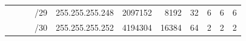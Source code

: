 \documentclass[11pt,a4paper]{article}
\begin{document}
\begin{table}[]
\begin{tabular}{ccccl|r|r|r|r|r|r|}
\multicolumn{1}{|c|}{}                                 & \multicolumn{1}{c|}{}                                  & \multicolumn{1}{c|}{}                                  & \multicolumn{1}{c|}{/29} & 255.255.255.248              & 2097152                      & 8192                         & 32                           & 6                            & 6                            & 6                            \\ \cline{4-11} 
\multicolumn{1}{|c|}{}                                 & \multicolumn{1}{c|}{}                                  & \multicolumn{1}{c|}{}                                  & \multicolumn{1}{c|}{/30} & 255.255.255.252              & 4194304                      & 16384                        & 64                           & 2                            & 2                            & 2                            \\ \hline
\end{tabular}
\end{table}
\end{document}
